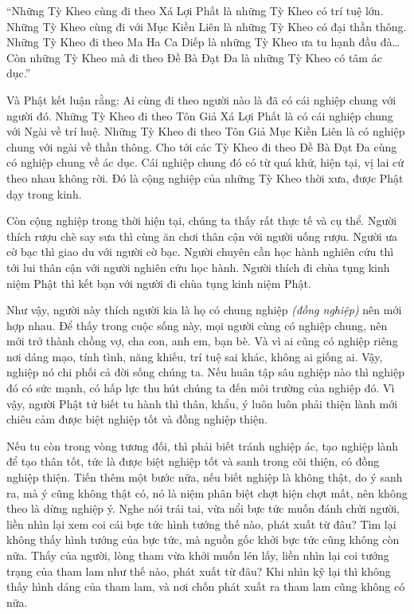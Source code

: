\documentclass[
  12pt,
  oneside]{book}
\begin{document}
``Những Tỳ Kheo cùng đi theo Xá Lợi Phất là những Tỳ Kheo có trí tuệ lớn. Những Tỳ Kheo cùng đi với Mục Kiền Liên là những Tỳ Kheo có đại thần thông. Những Tỳ Kheo đi theo Ma Ha Ca Diếp là những Tỳ Kheo ưa tu hạnh đầu đà\ldots{} Còn những Tỳ Kheo mà đi theo Đề Bà Đạt Đa là những Tỳ Kheo có tâm ác dục.''

Và Phật kết luận rằng: Ai cùng đi theo người nào là đã có cái nghiệp chung với người đó. Những Tỳ Kheo đi theo Tôn Giả Xá Lợi Phất là có cái nghiệp chung với Ngài về trí huệ. Những Tỳ Kheo đi theo Tôn Giả Mục Kiền Liên là có nghiệp chung với ngài về thần thông. Cho tới các Tỳ Kheo đi theo Đề Bà Đạt Đa cùng có nghiệp chung về ác dục. Cái nghiệp chung đó có từ quá khứ, hiện tại, vị lai cứ theo nhau không rời. Đó là cộng nghiệp của những Tỳ Kheo thời xưa, được Phật dạy trong kinh.

Còn cộng nghiệp trong thời hiện tại, chúng ta thấy rất thực tế và cụ thể. Người thích rượu chè say sưa thì cùng ăn chơi thân cận với người uống rượu. Người ưa cờ bạc thì giao du với người cờ bạc. Người chuyên cần học hành nghiên cứu thì tới lui thân cận với người nghiên cứu học hành. Người thích đi chùa tụng kinh niệm Phật thì kết bạn với người đi chùa tụng kinh niệm Phật.

Như vậy, người này thích người kia là họ có chung nghiệp \emph{(đồng nghiệp)} nên mới hợp nhau. Để thấy trong cuộc sống này, mọi người cùng có nghiệp chung, nên mới trở thành chồng vợ, cha con, anh em, bạn bè. Và vì ai cũng có nghiệp riêng nơi dáng mạo, tính tình, năng khiếu, trí tuệ sai khác, không ai giống ai. Vậy, nghiệp nó chi phối cả đời sống chúng ta. Nếu huân tập sâu nghiệp nào thì nghiệp đó có sức mạnh, có hấp lực thu hút chúng ta đến môi trường của nghiệp đó. Vì vậy, người Phật tử biết tu hành thì thân, khẩu, ý luôn luôn phải thiện lành mới chiêu cảm được biệt nghiệp tốt và đồng nghiệp thiện.

Nếu tu còn trong vòng tương đối, thì phải biết tránh nghiệp ác, tạo nghiệp lành để tạo thân tốt, tức là được biệt nghiệp tốt và sanh trong cõi thiện, có đồng nghiệp thiện. Tiến thêm một bước nữa, nếu biết nghiệp là không thật, do ý sanh ra, mà ý cũng không thật có, nó là niệm phân biệt chợt hiện chợt mất, nên không theo là dừng nghiệp ý. Nghe nói trái tai, vừa nổi bực tức muốn đánh chửi người, liền nhìn lại xem coi cái bực tức hình tướng thế nào, phát xuất từ đâu? Tìm lại không thấy hình tướng của bực tức, mà nguồn gốc khởi bực tức cũng không còn nữa. Thấy của người, lòng tham vừa khởi muốn lén lấy, liền nhìn lại coi tướng trạng của tham lam như thế nào, phát xuất từ đâu? Khi nhìn kỹ lại thì không thấy hình dáng của tham lam, và nơi chốn phát xuất ra tham lam cũng không có nữa.
\end{document}
